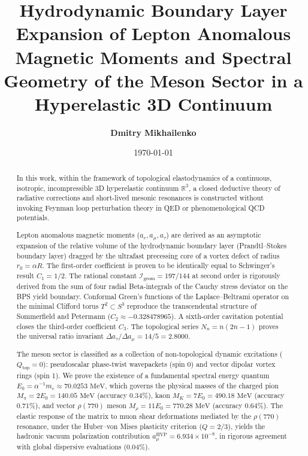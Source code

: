 \documentclass[12pt,a4paper]{article}
\title{\textbf{Hydrodynamic Boundary Layer Expansion of Lepton Anomalous Magnetic Moments and Spectral Geometry of the Meson Sector in a Hyperelastic 3D Continuum}}
\author{\textbf{Dmitry Mikhailenko}}
\date{\today}
\begin{document}
	
	\maketitle
	
	\begin{abstract}
		In this work, within the framework of topological elastodynamics of a continuous, isotropic, incompressible 3D hyperelastic continuum $\mathbb{R}^3$, a closed deductive theory of radiative corrections and short-lived mesonic resonances is constructed without invoking Feynman loop perturbation theory in QED or phenomenological QCD potentials.
		
		Lepton anomalous magnetic moments ($a_e, a_\mu, a_\tau$) are derived as an asymptotic expansion of the relative volume of the hydrodynamic boundary layer (Prandtl--Stokes boundary layer) dragged by the ultrafast precessing core of a vortex defect of radius $r_0 = \alpha R$. The first-order coefficient is proven to be identically equal to Schwinger's result $C_1 = 1/2$. The rational constant $\mathcal{I}_{\text{geom}} = 197/144$ at second order is rigorously derived from the sum of four radial Beta-integrals of the Cauchy stress deviator on the BPS yield boundary. Conformal Green's functions of the Laplace--Beltrami operator on the minimal Clifford torus $T^2 \subset S^3$ reproduce the transcendental structure of Sommerfield and Petermann ($C_2 \approx -0.328478965$). A sixth-order cavitation potential closes the third-order coefficient $C_3$. The topological series $N_n = n(2n-1)$ proves the universal ratio invariant $\Delta a_\tau / \Delta a_\mu = 14/5 = 2.8000$.
		
		The meson sector is classified as a collection of non-topological dynamic excitations ($Q_{\text{top}} = 0$): pseudoscalar phase-twist wavepackets (spin 0) and vector dipolar vortex rings (spin 1). We prove the existence of a fundamental spectral energy quantum $E_0 = \alpha^{-1} m_e \approx 70.0253\text{ MeV}$, which governs the physical masses of the charged pion $M_\pi = 2 E_0 = 140.05\text{ MeV}$ (accuracy $0.34\%$), kaon $M_K = 7 E_0 = 490.18\text{ MeV}$ (accuracy $0.71\%$), and vector $\rho(770)$ meson $M_\rho = 11 E_0 = 770.28\text{ MeV}$ (accuracy $0.64\%$). The elastic response of the matrix to muon shear deformations mediated by the $\rho(770)$ resonance, under the Huber--von Mises plasticity criterion ($Q = 2/3$), yields the hadronic vacuum polarization contribution $a_\mu^{\text{HVP}} = 6.934 \times 10^{-8}$, in rigorous agreement with global dispersive evaluations ($0.04\%$).
	\end{abstract}
	
\end{document}
